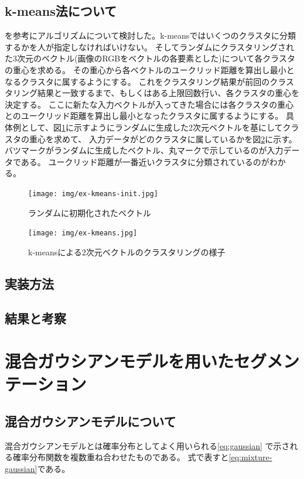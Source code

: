 \documentclass[11pt,a4j]{jsarticle}
\begin{document}
    \subsection{k-means法について}
    \cite{k-means}を参考にアルゴリズムについて検討した。k-meansではいくつのクラスタに分類するかを人が指定しなければいけない。
    そしてランダムにクラスタリングされた3次元のベクトル(画像のRGBをベクトルの各要素とした)について各クラスタの重心を求める。
    その重心から各ベクトルのユークリッド距離を算出し最小となるクラスタに属するようにする。
    これをクラスタリング結果が前回のクラスタリング結果と一致するまで、もしくはある上限回数行い、各クラスタの重心を決定する。
    ここに新たな入力ベクトルが入ってきた場合には各クラスタの重心とのユークリッド距離を算出し最小となったクラスタに属するようにする。
    具体例として、図\ref{fig:ex-kmeans-init}に示すようにランダムに生成した2次元ベクトルを基にしてクラスタの重心を求めて、
    入力データがどのクラスタに属しているかを図\ref{fig:ex-kmeans}に示す。
    バツマークがランダムに生成したベクトル、丸マークで示しているのが入力データである。
    ユークリッド距離が一番近いクラスタに分類されているのがわかる。

    \begin{figure}[H]
        \centering
        \texttt{[image: img/ex-kmeans-init.jpg]}
        \caption{ランダムに初期化されたベクトル\label{fig:ex-kmeans-init}}
    \end{figure} 

    \begin{figure}[H]
        \centering
        \texttt{[image: img/ex-kmeans.jpg]}
        \caption{k-meansによる2次元ベクトルのクラスタリングの様子\label{fig:ex-kmeans}}
    \end{figure} 

    \subsection{実装方法}
    \subsection{結果と考察}

    \section{混合ガウシアンモデルを用いたセグメンテーション}
    \subsection{混合ガウシアンモデルについて}
    混合ガウシアンモデルとは確率分布としてよく用いられる\ref{eq:gaussian}
    で示される確率分布関数を複数重ね合わせたものである。
    式で表すと\ref{eq:mixture-gaussian}である。
\end{document}
